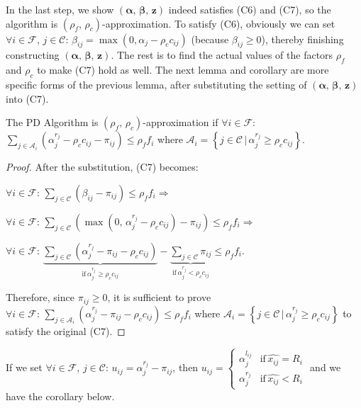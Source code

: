 \documentclass[10pt]{llncs}
\begin{document}
In the last step, we show $\left(\boldsymbol{\alpha},\,\boldsymbol{\beta},\,\boldsymbol{z}\right)$
indeed satisfies (C6) and (C7), so the algorithm is $\left(\rho_{f},\,\rho_{c}\right)$-approximation.
To satisfy (C6), obviously we can set $\forall i\in\mathcal{F},\, j\in\mathcal{C}:\,\beta_{ij}=\max\left(0,\alpha_{j}-\rho_{c}c_{ij}\right)$
(because $\beta_{ij}\geq0$), thereby finishing constructing $\left(\boldsymbol{\alpha},\,\boldsymbol{\beta},\,\boldsymbol{z}\right)$.
The rest is to find the actual values of the factors $\rho_{f}$ and
$\rho_{c}$ to make (C7) hold as well. The next lemma and corollary
are more specific forms of the previous lemma, after substituting
the setting of $\left(\boldsymbol{\alpha},\,\boldsymbol{\beta},\,\boldsymbol{z}\right)$
into (C7).
\begin{lemma}
The PD Algorithm is $\left(\rho_{f},\,\rho_{c}\right)$-approximation
if $\forall i\in\mathcal{F}:\,$\linebreak{}
$\sum_{j\in\mathcal{A}_{i}}\left(\alpha_{j}^{r_{j}}-\rho_{c}c_{ij}-\pi_{ij}\right)\leq\rho_{f}f_{i}$
where $\mathcal{A}_{i}=\left\{ j\in\mathcal{C}\,|\,\alpha_{j}^{r_{j}}\geq\rho_{c}c_{ij}\right\} $.\label{lem:s-appro}\end{lemma}
\begin{proof}
After the substitution, (C7) becomes:

$\forall i\in\mathcal{F}:\,\sum_{j\in\mathcal{C}}\left(\beta_{ij}-\pi_{ij}\right)\leq\rho_{f}f_{i}\Rightarrow$

$\forall i\in\mathcal{F}:\,\sum_{j\in\mathcal{C}}\left(\max\left(0,\,\alpha_{j}^{r_{j}}-\rho_{c}c_{ij}\right)-\pi_{ij}\right)\leq\rho_{f}f_{i}\Rightarrow$

$\forall i\in\mathcal{F}:\,\underset{\textrm{if}\,\alpha_{j}^{r_{j}}\geq\rho_{c}c_{ij}}{\underbrace{\sum_{j\in\mathcal{C}}\left(\alpha_{j}^{r_{j}}-\pi_{ij}-\rho_{c}c_{ij}\right)}}-\underset{\textrm{if}\,\alpha_{j}^{r_{j}}<\rho_{c}c_{ij}}{\underbrace{\sum_{j\in\mathcal{C}}\pi_{ij}}}\leq\rho_{f}f_{i}$.

Therefore, since $\pi_{ij}\geq0$, it is sufficient to prove $\forall i\in\mathcal{F}:\,\sum_{j\in\mathcal{A}_{i}}\left(\alpha_{j}^{r_{j}}-\pi_{ij}-\rho_{c}c_{ij}\right)\leq\rho_{f}f_{i}$
where $\mathcal{A}_{i}=\left\{ j\in\mathcal{C}\,|\,\alpha_{j}^{r_{j}}\geq\rho_{c}c_{ij}\right\} $
to satisfy the original (C7).
\end{proof}
If we set $\forall i\in\mathcal{F},\, j\in\mathcal{C}:\, u_{ij}=\alpha_{j}^{r_{j}}-\pi_{ij}$,
then $u_{ij}=\begin{cases}
\alpha_{j}^{l_{ij}} & \textrm{if}\,\hat{x_{ij}}=R_{i}\\
\alpha_{j}^{r_{j}} & \textrm{if}\,\hat{x_{ij}}<R_{i}
\end{cases}$ and we have the corollary below.
\end{document}
